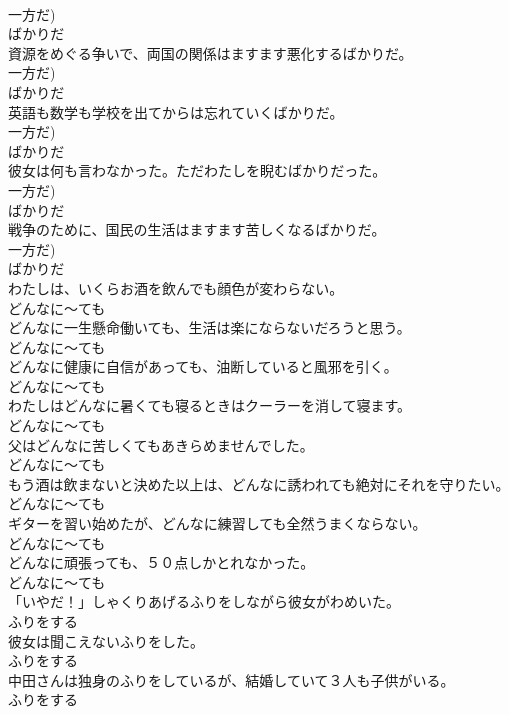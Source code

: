 \documentclass[8pt]{extreport}
\begin{document}
\begin{CJK}{UTF8}{min}
\\	一方だ)	
\\	ばかりだ
\\	資源をめぐる争いで、両国の関係はますます悪化するばかりだ。	
\\	一方だ)	
\\	ばかりだ
\\	英語も数学も学校を出てからは忘れていくばかりだ。	
\\	一方だ)	
\\	ばかりだ
\\	彼女は何も言わなかった。ただわたしを睨むばかりだった。	
\\	一方だ)	
\\	ばかりだ
\\	戦争のために、国民の生活はますます苦しくなるばかりだ。	
\\	一方だ)	
\\	ばかりだ
\\	わたしは、いくらお酒を飲んでも顔色が変わらない。	
\\	どんなに～ても
\\	どんなに一生懸命働いても、生活は楽にならないだろうと思う。	
\\	どんなに～ても
\\	どんなに健康に自信があっても、油断していると風邪を引く。	
\\	どんなに～ても
\\	わたしはどんなに暑くても寝るときはクーラーを消して寝ます。	
\\	どんなに～ても
\\	父はどんなに苦しくてもあきらめませんでした。	
\\	どんなに～ても
\\	もう酒は飲まないと決めた以上は、どんなに誘われても絶対にそれを守りたい。	
\\	どんなに～ても
\\	ギターを習い始めたが、どんなに練習しても全然うまくならない。	
\\	どんなに～ても
\\	どんなに頑張っても、５０点しかとれなかった。	
\\	どんなに～ても
\\	「いやだ！」しゃくりあげるふりをしながら彼女がわめいた。	
\\	ふりをする
\\	彼女は聞こえないふりをした。	
\\	ふりをする
\\	中田さんは独身のふりをしているが、結婚していて３人も子供がいる。	
\\	ふりをする

\end{CJK}
\end{document}
